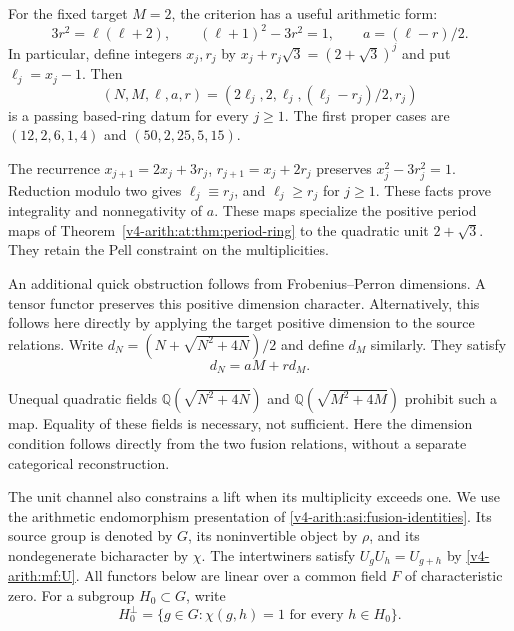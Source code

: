 For the fixed target $M=2$, the criterion has a useful arithmetic form:
\[
 3r^2=\ell(\ell+2),\qquad (\ell+1)^2-3r^2=1,\qquad a=(\ell-r)/2.
\]
In particular, define integers $x_j,r_j$ by $x_j+r_j\sqrt3=(2+\sqrt3)^j$ and put $\ell_j=x_j-1$.
Then
\[
 (N,M,\ell,a,r)=(2\ell_j,2,\ell_j,(\ell_j-r_j)/2,r_j)
\]
is a passing based-ring datum for every $j\ge1$. The first proper cases are $(12,2,6,1,4)$ and
$(50,2,25,5,15)$.

The recurrence $x_{j+1}=2x_j+3r_j$, $r_{j+1}=x_j+2r_j$ preserves
$x_j^2-3r_j^2=1$. Reduction modulo two gives $\ell_j\equiv r_j$, and $\ell_j\ge r_j$ for
$j\ge1$.
These facts prove integrality and nonnegativity of $a$. These maps specialize the positive
period maps of Theorem~\ref{v4-arith:at:thm:period-ring} to the quadratic unit $2+\sqrt3$. They retain
the Pell constraint on the multiplicities.


An additional quick obstruction follows from Frobenius--Perron dimensions. A tensor functor
preserves this positive dimension character. Alternatively, this follows here directly by
applying the target positive dimension to the source relations. Write $d_N=(N+\sqrt{N^2+4N})/2$
and define $d_M$ similarly. They satisfy
\[
 d_N=aM+r d_M.
\]

Unequal quadratic fields $\mathbb Q(\sqrt{N^2+4N})$ and $\mathbb Q(\sqrt{M^2+4M})$ prohibit such
a map. Equality of these fields is necessary, not sufficient. Here the dimension condition
follows directly from the two fusion relations, without a separate categorical reconstruction.

The unit channel also constrains a lift when its multiplicity exceeds
one. We use the arithmetic endomorphism presentation of
\eqref{v4-arith:asi:fusion-identities}. Its source group is denoted by $G$,
its noninvertible object by $\rho$, and its nondegenerate bicharacter
by $\chi$. The intertwiners satisfy $U_gU_h=U_{g+h}$ by
\eqref{v4-arith:mf:U}. All functors below are linear over a common field
$F$ of characteristic zero. For a subgroup $H_0\subset G$, write
\[
 H_0^\perp=\{g\in G:\chi(g,h)=1\text{ for every }h\in H_0\}.
\]

